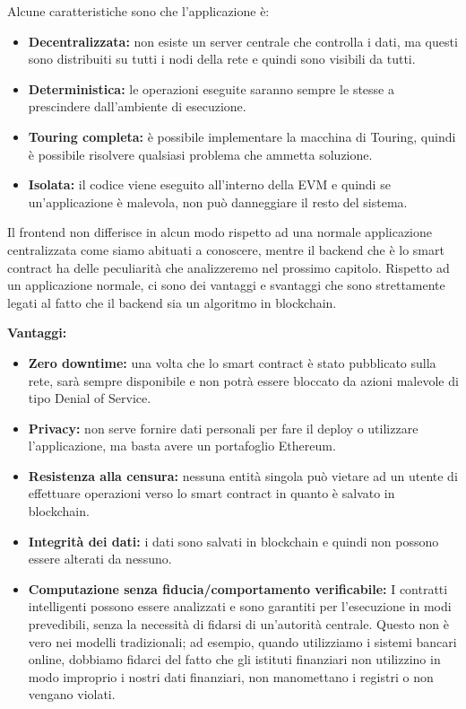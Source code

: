 Alcune caratteristiche sono che l'applicazione è:
\begin{itemize}
    \item \textbf{Decentralizzata:} non esiste un server centrale che
        controlla i dati, ma questi sono distribuiti su tutti i nodi della
        rete e quindi sono visibili da tutti.
    \item \textbf{Deterministica:} le operazioni eseguite saranno sempre le
        stesse a prescindere dall'ambiente di esecuzione.
    \item \textbf{Touring completa:} è possibile implementare la macchina di
        Touring, quindi è possibile risolvere qualsiasi problema che ammetta
        soluzione.
    \item \textbf{Isolata:} il codice viene eseguito all'interno della EVM e 
        quindi se un'applicazione è malevola, non può danneggiare il resto del
        sistema.
\end{itemize}

\newpage

Il frontend non differisce in alcun modo rispetto ad una normale applicazione
centralizzata come siamo abituati a conoscere, mentre il backend che è lo smart
contract ha delle peculiarità che analizzeremo nel prossimo capitolo.
Rispetto ad un applicazione normale, ci sono dei vantaggi e svantaggi che sono
strettamente legati al fatto che il backend sia un algoritmo in blockchain.

\textbf{Vantaggi:}
\begin{itemize}
    \item \textbf{Zero downtime:} una volta che lo smart contract è stato 
        pubblicato sulla rete, sarà sempre disponibile e non potrà essere 
        bloccato da azioni malevole di tipo Denial of Service.
    \item \textbf{Privacy:} non serve fornire dati personali per fare il deploy
        o utilizzare l'applicazione, ma basta avere un portafoglio Ethereum.
    \item \textbf{Resistenza alla censura:} nessuna entità singola può vietare
        ad un utente di effettuare operazioni verso lo smart contract in quanto
        è salvato in blockchain.
    \item \textbf{Integrità dei dati:} i dati sono salvati in blockchain e
        quindi non possono essere alterati da nessuno.
    \item \textbf{Computazione senza fiducia/comportamento verificabile:} I
        contratti intelligenti possono essere analizzati e sono garantiti per
        l'esecuzione in modi prevedibili, senza la necessità di fidarsi di
        un'autorità centrale. Questo non è vero nei modelli tradizionali; ad
        esempio, quando utilizziamo i sistemi bancari online, dobbiamo fidarci
        del fatto che gli istituti finanziari non utilizzino in modo improprio
        i nostri dati finanziari, non manomettano i registri o non vengano
        violati.
\end{itemize}

